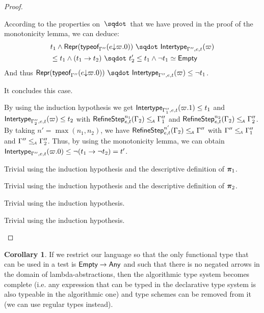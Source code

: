 \documentclass[a4paper]{article}
\theoremstyle{definition}
\newtheorem{corollary}{Corollary}
\begin{document}
\begin{proof}
\begin{description}
\begin{description}
      According to the properties on $\worra {} {}$ that we have proved in the proof of the monotonicity lemma,
      we can deduce:
      \begin{align*}
      &t_1 \land \worra {\tsrep{\tyof {\occ e {\varpi.0}} {\Gamma''}}} {\env {\Gamma'',e,t} (\varpi)}\\
      &\leq t_1 \land \worra {(\arrow {t_1} {t_2})} {t_2'} \leq t_1 \land \neg t_1 \simeq \Empty
      \end{align*}
      And thus $\worra {\tsrep{\tyof {\occ e {\varpi.0}} {\Gamma''}}} {\env {\Gamma'',e,t} (\varpi)} \leq \neg t_1$.

      It concludes this case.

      \item[\Rule{PAppL}] By using the induction hypothesis we get
      $\textsf{Intertype}_{\Gamma_1'',e,t} (\varpi.1) \leq t_1$ and $\textsf{Intertype}_{\Gamma_2'',e,t} (\varpi) \leq t_2$
      with $\textsf{RefineStep}_{e,t}^{n_1} (\Gamma_2) \leq_{\!\scriptscriptstyle\mathcal{A}} \Gamma_1''$ and
      $\textsf{RefineStep}_{e,t}^{n_2} (\Gamma_2) \leq_{\!\scriptscriptstyle\mathcal{A}} \Gamma_2''$. By taking $n'=\max (n_1,n_2)$,
      we have $\textsf{RefineStep}_{e,t}^{n'} (\Gamma_2) \leq_{\!\scriptscriptstyle\mathcal{A}} \Gamma''$ with $\Gamma'' \leq_{\!\scriptscriptstyle\mathcal{A}} \Gamma_1''$ and $\Gamma'' \leq_{\!\scriptscriptstyle\mathcal{A}} \Gamma_2''$.
      Thus, by using the monotonicity lemma, we can obtain $\textsf{Intertype}_{\Gamma'',e,t} (\varpi.0) \leq \neg (t_1\to \neg t_2) = t'$.
  
      \item[\Rule{PPairL}] Trivial using the induction hypothesis and the descriptive definition of $\boldsymbol{\pi}_1$.
      \item[\Rule{PPairR}] Trivial using the induction hypothesis and the descriptive definition of $\boldsymbol{\pi}_2$.
      \item[\Rule{PFst}] Trivial using the induction hypothesis.
      \item[\Rule{PSnd}] Trivial using the induction hypothesis.
    \end{description}
  \end{description}
  \end{proof}

  \begin{corollary}\label{app:completeness}
    If we restrict our language so that the only functional type that can be used in a test is $\textsf{Empty}\to \textsf{Any}$
    and such that there is no negated arrows in the domain of lambda-abstractions,
    then the algorithmic type system becomes complete
    (i.e. any expression that can be typed in the declarative type system is also typeable in the algorithmic one)
    and type schemes can be removed from it (we can use regular types instead).
  \end{corollary}
\end{document}

